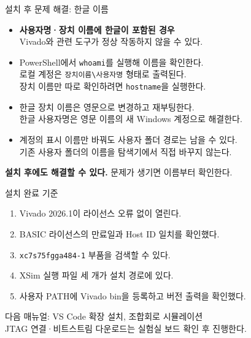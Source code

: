 \documentclass[aspectratio=43,11pt]{beamer}
\begin{document}
\begin{frame}{설치 후 문제 해결: 한글 이름}
\small
\begin{itemize}
\item \textbf{사용자명·장치 이름에 한글이 포함된 경우}\\
Vivado와 관련 도구가 정상 작동하지 않을 수 있다.
\item PowerShell에서 \texttt{whoami}를 실행해 이름을 확인한다.\\
로컬 계정은 \texttt{장치이름\textbackslash 사용자명} 형태로 출력된다.\\
장치 이름만 따로 확인하려면 \texttt{hostname}을 실행한다.
\item 한글 장치 이름은 영문으로 변경하고 재부팅한다.\\
한글 사용자명은 영문 이름의 새 Windows 계정으로 해결한다.
\item 계정의 표시 이름만 바꿔도 사용자 폴더 경로는 남을 수 있다.\\
기존 사용자 폴더의 이름을 탐색기에서 직접 바꾸지 않는다.
\end{itemize}
\vspace{0.25cm}
\textbf{설치 후에도 해결할 수 있다.} 문제가 생기면 이름부터 확인한다.
\end{frame}

\begin{frame}{설치 완료 기준}
\begin{enumerate}
\item Vivado 2026.1이 라이선스 오류 없이 열린다.
\item BASIC 라이선스의 만료일과 Host ID 일치를 확인했다.
\item \texttt{xc7s75fgga484-1} 부품을 검색할 수 있다.
\item XSim 실행 파일 세 개가 설치 경로에 있다.
\item 사용자 PATH에 Vivado bin을 등록하고 버전 출력을 확인했다.
\end{enumerate}
\vspace{0.4cm}
다음 매뉴얼: VS Code 확장 설치, 조합회로 시뮬레이션\\
\small JTAG 연결·비트스트림 다운로드는 실험실 보드 확인 후 진행한다.
\end{frame}
\end{document}
